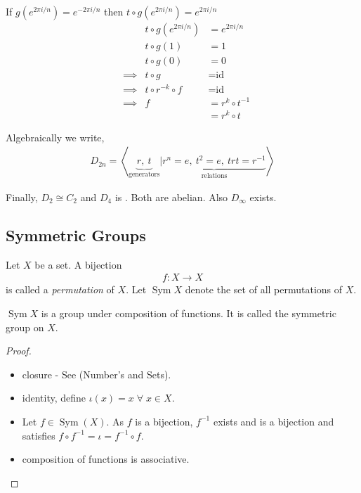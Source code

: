 If $g(e^{2 \pi i /n}) = e^{-2 \pi i /n}$ then $t \circ g(e^{2 \pi i / n}) = e^{2 \pi i / n}$
\begin{align*}
    && t \circ g(e^{2 \pi i / n}) &= e^{2 \pi i / n} \\
    && t \circ g (1) &= 1 \\
    && t \circ g (0) &= 0 \\
    &\implies & t \circ g &= \text{id} \\
    &\implies & t \circ r^{-k} \circ f &= \text{id} \\
    &\implies & f &= r^{k} \circ t^{-1} \\
    && &= r^k \circ t
\end{align*}

Algebraically we write,
\begin{align*}
    D_{2n} = \left\langle \underbrace{r,\ t}_\text{generators} | \underbrace{r^n = e,\ t^2 = e,\ trt = r^{-1}}_\text{relations} \right\rangle 
\end{align*}

Finally, $D_2 \cong C_2$ and $D_4$ is .
Both are abelian.
Also $D_\infty$ exists.

\hypertarget{symmetric-groups}{%
\subsection{Symmetric Groups}\label{symmetric-groups}}

\begin{definition}[permutation] \label{def:permutation}
Let $X$ be a set.
A bijection \begin{align*}
    f: X \to X
\end{align*} is called a \emph{permutation} of $X$.
Let $\operatorname{Sym} X$ denote the set of all permutations of $X$.
\end{definition} 

\begin{proposition}
$\operatorname{Sym} X$ is a group under composition of functions. It is called the symmetric group on $X$.
\end{proposition}

\begin{proof} ~
\begin{itemize}
\item
  closure - See  (Number's and Sets).
\item
  identity, define $\iota (x) = x \; \forall \; x \in X$.
\item
  Let $f \in \operatorname{Sym}(X)$.
  As $f$ is a bijection, $f^{-1}$ exists and is a bijection and satisfies $f \circ f^{-1} = \iota = f^{-1} \circ f$.
\item
  composition of functions is associative.
\end{itemize}
\end{proof}

